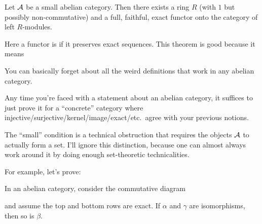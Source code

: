 \begin{theorem}
	Let $\AA$ be a small abelian category.
	Then there exists a ring $R$ (with $1$ but possibly non-commutative)
	and a full, faithful, exact functor onto the category of left $R$-modules.
\end{theorem}
Here a functor is  if it preserves exact sequences.
This theorem is good because it means
\begin{moral}
	You can basically forget about all the weird definitions
	that work in any abelian category.
\end{moral}
Any time you're faced with a statement about an abelian category,
it suffices to just prove it for a ``concrete'' category
where injective/surjective/kernel/image/exact/etc.\
agree with your previous notions.

\begin{remark}
	The ``small'' condition is a technical obstruction
	that requires the objects $\AA$ to actually form a set.
	I'll ignore this distinction,
	because one can almost always work around it
	by doing enough set-theoretic technicalities.
\end{remark}

For example, let's prove:
\begin{lemma}
	In an abelian category, consider the commutative diagram
	\begin{center}
	\end{center}
	and assume the top and bottom rows are exact.
	If $\alpha$ and $\gamma$ are isomorphisms, then so is $\beta$.
\end{lemma}

